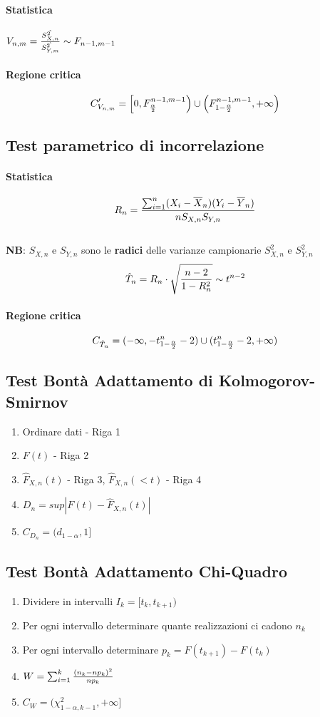 \documentclass[12pt]{article}
\begin{document}
    \paragraph{Statistica} $V_{n, m} = {\hat{S^2_{X,n}} \over \hat{S^2_{Y,m}}} \sim F_{n-1, m-1}$
    \paragraph{Regione critica}
    $$C_{V_{n,m}}' = \left[0, F_{\alpha \over 2}^{n-1,m-1} \right) \cup \left(F_{1 - {\alpha \over 2}}^{n-1,m-1}, +\infty\right)$$ 

    \subsection{Test parametrico di incorrelazione }
    \paragraph{Statistica} $$R_n = {{\sum_{i=1}^n(X_i - \overline{X}_n)(Y_i - \overline{Y}_n)}\over{nS_{X,n}S_{Y,n}}}$$
    \\\textbf{NB}: $S_{X,n}$ e $S_{Y,n}$ sono le \textbf{radici} delle varianze campionarie $S_{X,n}^2$ e $S_{Y,n}^2$
    $$\hat{T}_n = R_n \cdot \sqrt{{n-2}\over{1- R_n^2}} \sim t^{n-2}$$
    \paragraph{Regione critica}
    $$C_{\hat{T}_n} = (-\infty, -t_{1-{\alpha \over 2}}^n-2) \cup (t_{1-{\alpha \over 2}}^n-2, +\infty)$$

    \newpage
    \subsection{Test Bontà Adattamento di Kolmogorov-Smirnov}
    \begin{enumerate}
        \item Ordinare dati - Riga 1
        \item $F(t)$ - Riga 2
        \item $\hat{F}_{X, n}(t)$ - Riga 3, $\hat{F}_{X, n}(< t)$ - Riga 4
        \item $D_n = sup|F(t) - \hat{F}_{X, n}(t)|$
        \item $C_{D_n} = (d_{1-\alpha}, 1]$
    \end{enumerate}
    \subsection{Test Bontà Adattamento Chi-Quadro}
    \begin{enumerate}
        \item Dividere in intervalli $I_k = [t_k, t_{k+1})$
        \item Per ogni intervallo determinare quante realizzazioni ci cadono $n_k$
        \item Per ogni intervallo determinare $p_k = F(t_{k+1}) - F(t_k)$
        \item $W = \sum_{i=1}^k {{(n_k - np_k)^2}\over{np_k}}$
        \item $C_{W} = (\chi^2_{1-\alpha, k-1}, +\infty]$
    \end{enumerate}
\end{document}
